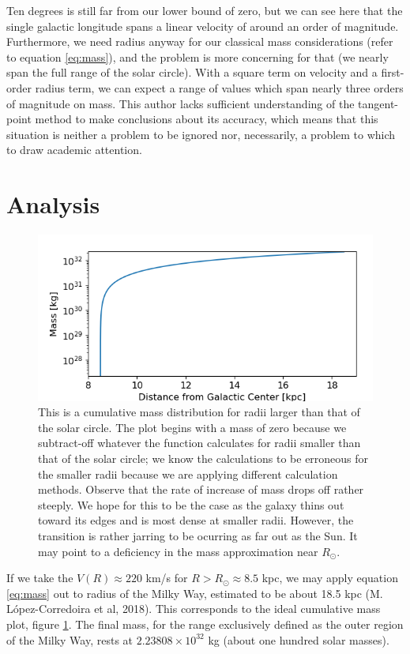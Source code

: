 \documentclass[12pt]{article}
\begin{document}
Ten degrees is still far from our lower bound of zero, but we can see here that the single galactic longitude spans a linear velocity of around an order of magnitude. Furthermore, we need radius anyway for our classical mass considerations (refer to equation \ref{eq:mass}), and the problem is more concerning for that (we nearly span the full range of the solar circle). With a square term on velocity and a first-order radius term, we can expect a range of values which span nearly three orders of magnitude on mass. This author lacks sufficient understanding of the tangent-point method to make conclusions about its accuracy, which means that this situation is neither a problem to be ignored nor, necessarily, a problem to which to draw academic attention.

\section{Analysis}

\begin{figure}
	\centering
	\includegraphics[width=.8\linewidth]{outer_mass_distro}
	\caption{This is a cumulative mass distribution for radii larger than that of the solar circle. The plot begins with a mass of zero because we subtract-off whatever the function calculates for radii smaller than that of the solar circle; we know the calculations to be erroneous for the smaller radii because we are applying different calculation methods. Observe that the rate of increase of mass drops off rather steeply. We hope for this to be the case as the galaxy thins out toward its edges and is most dense at smaller radii. However, the transition is rather jarring to be ocurring as far out as the Sun. It may point to a deficiency in the mass approximation near $R_\odot$.}
	\label{fig:outer_mass_distro}
\end{figure}

\quad \quad If we take the $V(R) \approx 220$ km/s for $R > R_\odot \approx 8.5$ kpc, we may apply equation \ref{eq:mass} out to radius of the Milky Way, estimated to be about 18.5 kpc (M. L\'{o}pez-Corredoira et al, 2018). This corresponds to the ideal cumulative mass plot, figure \ref{fig:outer_mass_distro}. The final mass, for the range exclusively defined as the outer region of the Milky Way, rests at $2.23808 \times 10^{32}$ kg (about one hundred solar masses).
\end{document}
